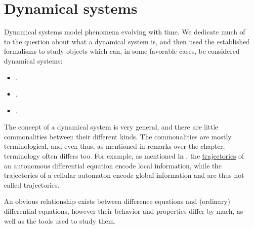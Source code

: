 \chapter{Dynamical systems}\label{ch:dynamical_systems}

Dynamical systems model phenomena evolving with time. We dedicate much of  to the question about what a dynamical system is, and then used the established formalisms to study objects which can, in some favorable cases, be considered dynamical systems:
\begin{itemize}
  \item {}.
  \item {}.
  \item {}.
\end{itemize}

The concept of a dynamical system is very general, and there are little commonalities between their different kinds. The commonalities are mostly terminological, and even thus, as mentioned in remarks over the chapter, terminology often differs too. For example, as mentioned in , the \hyperref[def:dynamical_system_trajectory]{trajectories} of an autonomous differential equation encode local information, while the trajectories of a cellular automaton encode global information and are thus not called trajectories.

An obvious relationship exists between difference equations and (ordinary) differential equations, however their behavior and properties differ by much, as well as the tools used to study them.
